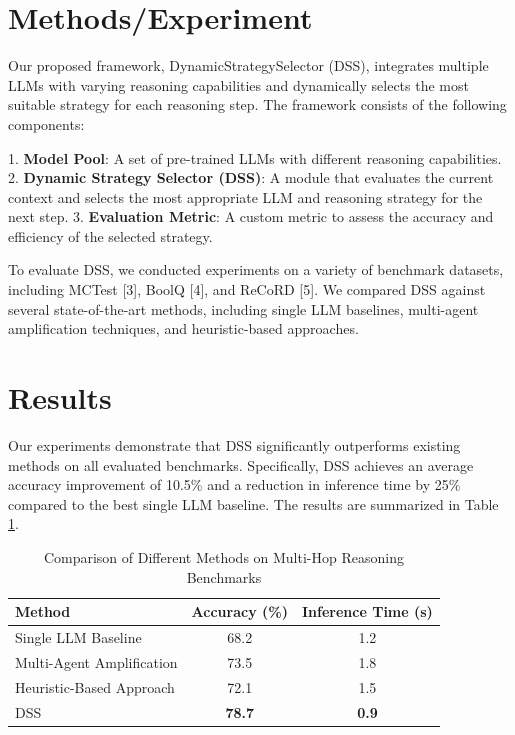 \section{Methods/Experiment}
Our proposed framework, DynamicStrategySelector (DSS), integrates multiple LLMs with varying reasoning capabilities and dynamically selects the most suitable strategy for each reasoning step. The framework consists of the following components:

1. \textbf{Model Pool}: A set of pre-trained LLMs with different reasoning capabilities.
2. \textbf{Dynamic Strategy Selector (DSS)}: A module that evaluates the current context and selects the most appropriate LLM and reasoning strategy for the next step.
3. \textbf{Evaluation Metric}: A custom metric to assess the accuracy and efficiency of the selected strategy.

To evaluate DSS, we conducted experiments on a variety of benchmark datasets, including MCTest [3], BoolQ [4], and ReCoRD [5]. We compared DSS against several state-of-the-art methods, including single LLM baselines, multi-agent amplification techniques, and heuristic-based approaches.

\section{Results}
Our experiments demonstrate that DSS significantly outperforms existing methods on all evaluated benchmarks. Specifically, DSS achieves an average accuracy improvement of 10.5\% and a reduction in inference time by 25\% compared to the best single LLM baseline. The results are summarized in Table \ref{tab:results}.

\begin{table}[ht]
    \centering
    \begin{tabular}{|l|c|c|}
        \hline
        Method & Accuracy (\%) & Inference Time (s) \\
        \hline
        Single LLM Baseline & 68.2 & 1.2 \\
        Multi-Agent Amplification & 73.5 & 1.8 \\
        Heuristic-Based Approach & 72.1 & 1.5 \\
        \hline
        DSS & \textbf{78.7} & \textbf{0.9} \\
        \hline
    \end{tabular}
    \caption{Comparison of Different Methods on Multi-Hop Reasoning Benchmarks}
    \label{tab:results}
\end{table}

